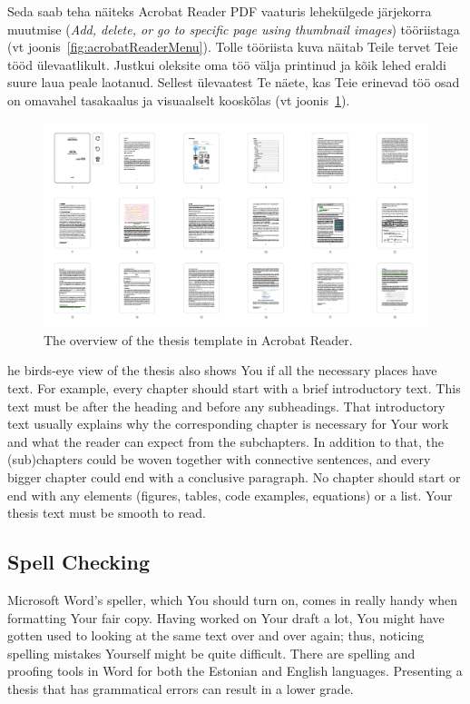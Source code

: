 Seda saab teha näiteks Acrobat Reader PDF vaaturis lehekülgede järjekorra muutmise (\emph{Add, delete, or go to specific page using thumbnail images}) tööriistaga (vt joonis~\ref{fig:acrobatReaderMenu}). Tolle tööriista kuva näitab Teile tervet Teie tööd ülevaatlikult. Justkui oleksite oma töö välja printinud ja kõik lehed eraldi suure laua peale laotanud. Sellest ülevaatest Te näete, kas Teie erinevad töö osad on omavahel tasakaalus ja visuaalselt kooskõlas (vt joonis~\ref{fig:acrobatReaderOverview}).

\begin{figure}[t]
    \centering
    \includegraphics[width=\textwidth]{figures/Figure6-AcrobatReaderOverview.png}
    \caption{The overview of the thesis template in Acrobat Reader.}
    \label{fig:acrobatReaderOverview}
\end{figure}
he birds-eye view of the thesis also shows You if all the necessary places have text. For example, every chapter should start with a brief introductory text. This text must be after the   heading and before any subheadings. That introductory text usually explains why the corresponding chapter is necessary for Your work and what the reader can expect from the subchapters. In addition to that, the (sub)chapters could be woven together with connective sentences, and every bigger chapter could end with a conclusive paragraph. No chapter should start or end with any elements (figures, tables, code examples, equations) or a list. Your thesis text must be smooth to read.

\subsection{Spell Checking}
Microsoft Word’s speller, which You should turn on, comes in really handy when formatting Your fair copy. Having worked on Your draft a lot, You might have gotten used to looking at the same text over and over again; thus, noticing spelling mistakes Yourself might be quite difficult. There are spelling and proofing tools in Word for both the Estonian and English languages. Presenting a thesis that has grammatical errors can result in a lower grade.

